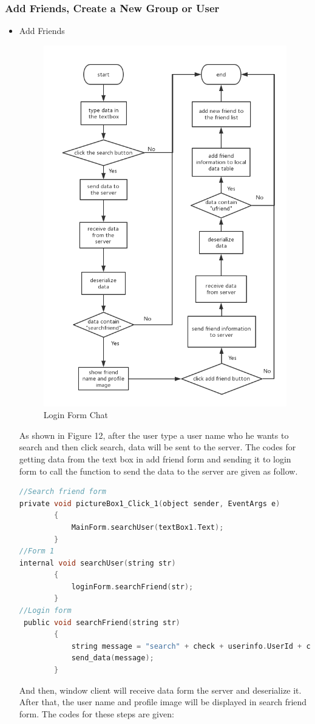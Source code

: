 \documentclass[a4paper,11pt]{article}
\begin{document}
\subsubsection{Add Friends, Create a New Group or User}
\begin{itemize}
\item Add Friends

\begin{figure}[h!]
\centering
\includegraphics[width = 0.8 \textwidth ]{add_friend_flow_chat.png}
\caption{\label{fig:UML}Login Form Chat}
\end{figure}


As shown in Figure 12, after the user type a user name who he wants to search and then click search, data will be sent to the server. The codes for getting data from the text box in add friend form and sending it to login form to call the function to send the data to the server are given as follow.

\begin{lstlisting}[language=C]
//Search friend form
private void pictureBox1_Click_1(object sender, EventArgs e)
        {
            MainForm.searchUser(textBox1.Text);
        }
//Form 1
internal void searchUser(string str)
        {
            loginForm.searchFriend(str);
        }
//Login form
 public void searchFriend(string str)
        {
            string message = "search" + check + userinfo.UserId + check + str;
            send_data(message);
        }
\end{lstlisting}
And then, window client will receive data form the server and deserialize it. After that, the user name and profile image will be displayed in search friend form. The codes for these steps are given:


\end{itemize}
\end{document}
